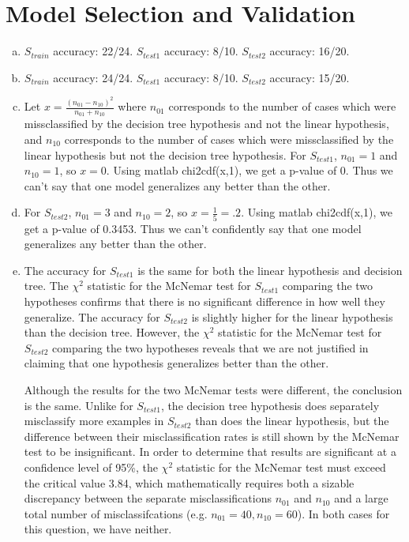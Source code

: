 \documentclass{article}
\begin{document}
\thispagestyle{fancy}

\section{Model Selection and Validation}

\begin{enumerate}[(a)]
\item $S_{train}$ accuracy: 22/24. $S_{test1}$ accuracy: 8/10. $S_{test2}$ accuracy: 16/20. 
\item $S_{train}$ accuracy: 24/24. $S_{test1}$ accuracy: 8/10. $S_{test2}$ accuracy: 15/20. 
\item Let $x=\frac{(n_{01}-n_{10})^2}{n_{01}+n_{10}}$ where $n_{01}$ corresponds to the number of cases which were missclassified by the decision tree hypothesis and not the linear hypothesis, and $n_{10}$ corresponds to the number of cases which were missclassified by the linear hypothesis but not the decision tree hypothesis. For $S_{test1}$, $n_{01}=1$ and $n_{10}=1$, so $x=0$. Using matlab chi2cdf(x,1), we get a p-value of 0. Thus we can't say that one model generalizes any better than the other.
\item For $S_{test2}$, $n_{01}=3$ and $n_{10}=2$, so $x=\frac{1}{5}=.2$. Using matlab chi2cdf(x,1), we get a p-value of 0.3453. Thus we can't confidently say that one model generalizes any better than the other.
\item The accuracy for $S_{test1}$ is the same for both the linear hypothesis and decision tree. The $\chi^2$ statistic for the McNemar test for $S_{test1}$ comparing the two hypotheses confirms that there is no significant difference in how well they generalize. The accuracy for $S_{test2}$ is slightly higher for the linear hypothesis than the decision tree. However, the $\chi^2$ statistic for the McNemar test for $S_{test2}$ comparing the two hypotheses reveals that we are not justified in claiming that one hypothesis generalizes better than the other. 

Although the results for the two McNemar tests were different, the conclusion is the same. Unlike for $S_{test1}$, the decision tree hypothesis does separately misclassify more examples in $S_{test2}$ than does the linear hypothesis, but the difference between their misclassification rates is still shown by the McNemar test to be insignificant. In order to determine that results are significant at a confidence level of 95\%, the $\chi^2$ statistic for the McNemar test must exceed the critical value 3.84, which mathematically requires both a sizable discrepancy between the separate misclassifications $n_{01}$ and $n_{10}$ and a large total number of misclassifcations (e.g. $n_{01}=40,n_{10}=60$). In both cases for this question, we have neither.

\end{enumerate}
\end{document}
